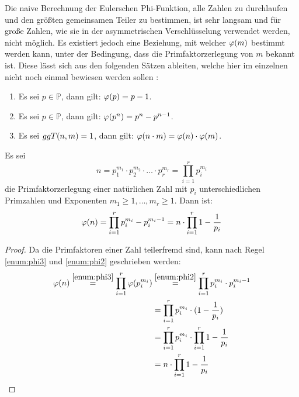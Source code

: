 \noindent
Die naive Berechnung der Eulerschen Phi-Funktion, alle Zahlen zu durchlaufen und den
größten gemeinsamen Teiler zu bestimmen, ist sehr langsam und für große Zahlen, wie sie
in der asymmetrischen Verschlüsselung verwendet werden, nicht möglich. Es existiert jedoch
eine Beziehung, mit welcher $\varphi(m)$ bestimmt werden kann, unter der
Bedingung, dass die Primfaktorzerlegung von $m$ bekannt ist. Diese lässt sich aus
den folgenden Sätzen ableiten, welche hier im einzelnen nicht noch einmal bewiesen werden
sollen \parencite{SITE:phi-euler-fermat}:
\begin{enumerate}[ref=(\arabic*)]
  \item Es sei $p \in \mathbb{P}$, dann gilt: $\varphi(p) = p - 1$. \label{enum:phi1}
  \item Es sei $p \in \mathbb{P}$, dann gilt: $\varphi(p^n) = p^n - p^{n-1}$. \label{enum:phi2}
  \item Es sei $ggT(n,m) = 1$, dann gilt:
        $\varphi(n \cdot m) = \varphi(n) \cdot \varphi(m)$. \label{enum:phi3}
\end{enumerate}

\begin{satz}
  Es sei
  \begin{equation*}
    n = p_1^{m_1} \cdot p_2^{m_2} \cdot \ldots \cdot p_r^{m_r} = \prod_{i=1}^{r} p_i^{m_i}
  \end{equation*}
  die Primfaktorzerlegung einer natürlichen Zahl mit $p_i$ unterschiedlichen Primzahlen
  und Exponenten $m_1 \geq 1,\ldots, m_r \geq 1$. Dann ist:
  \begin{equation*}
    \varphi(n) = \prod_{i=1}^{r} p_i^{m_i} - p_i^{m_i - 1} =
    n \cdot \prod_{i=1}^{r} 1 - \frac{1}{p_i}
  \end{equation*}
\end{satz}
\newpage
\begin{proof}
  Da die Primfaktoren einer Zahl teilerfremd sind, kann nach Regel \ref{enum:phi3}
  und \ref{enum:phi2} geschrieben werden:
  \begin{align*}
    \varphi(n) \stackrel{\ref{enum:phi3}}{=} \prod_{i=1}^{r} \varphi(p_i^{m_i})
     & \stackrel{\ref{enum:phi2}}{=} \prod_{i=1}^{r} p_i^{m_i} \cdot p_i^{m_i - 1} \\
     & = \prod_{i=1}^{r} p_i^{m_i} \cdot (1 - \frac{1}{p_i})                 \\
     & = \prod_{i=1}^{r} p_i^{m_i} \cdot \prod_{i=1}^{r} 1 - \frac{1}{p_i}   \\
     & = n \cdot \prod_{i=1}^{r} 1 - \frac{1}{p_i}
  \end{align*}
\end{proof}

